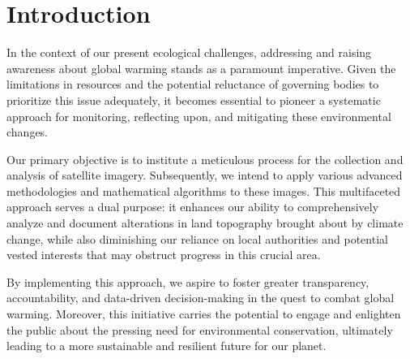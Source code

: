 \documentclass[12pt,a4paper]{article}
\begin{document}







\newpage
\section{Introduction}
In the context of our present ecological challenges, addressing and raising awareness about global warming stands as a paramount imperative. Given the limitations in resources and the potential reluctance of governing bodies to prioritize this issue adequately, it becomes essential to pioneer a systematic approach for monitoring, reflecting upon, and mitigating these environmental changes.

Our primary objective is to institute a meticulous process for the collection and analysis of satellite imagery. Subsequently, we intend to apply various advanced methodologies and mathematical algorithms to these images. This multifaceted approach serves a dual purpose: it enhances our ability to comprehensively analyze and document alterations in land topography brought about by climate change, while also diminishing our reliance on local authorities and potential vested interests that may obstruct progress in this crucial area.

By implementing this approach, we aspire to foster greater transparency, accountability, and data-driven decision-making in the quest to combat global warming. Moreover, this initiative carries the potential to engage and enlighten the public about the pressing need for environmental conservation, ultimately leading to a more sustainable and resilient future for our planet.
\end{document}
